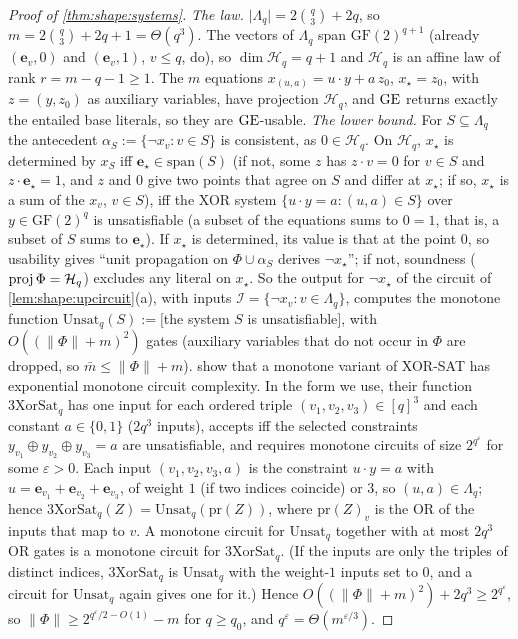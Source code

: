 \begin{proof}[Proof of \cref{thm:shape:systems}]
\emph{The law.} $\lvert\Lambda_q\rvert=2\binom q3+2q$, so $m=2\binom q3+2q+1=\Theta(q^3)$. The vectors of $\Lambda_q$ span $\mathrm{GF}(2)^{q+1}$ (already $(\mathbf e_v,0)$ and $(\mathbf e_v,1)$, $v\le q$, do), so $\dim\mathcal H_q=q+1$ and $\mathcal H_q$ is an affine law of rank $r=m-q-1\ge1$. The $m$ equations $x_{(u,a)}=u\cdot y+a\,z_0$, $x_\star=z_0$, with $z=(y,z_0)$ as auxiliary variables, have projection $\mathcal H_q$, and $\mathrm{GE}$ returns exactly the entailed base literals, so they are $\mathrm{GE}$-usable.
\emph{The lower bound.} For $S\subseteq\Lambda_q$ the antecedent $\alpha_S:=\{\neg x_v:v\in S\}$ is consistent, as $0\in\mathcal H_q$. On $\mathcal H_q$, $x_\star$ is determined by $x_S$ iff $\mathbf e_\star\in\mathrm{span}(S)$ (if not, some $z$ has $z\cdot v=0$ for $v\in S$ and $z\cdot\mathbf e_\star=1$, and $z$ and $0$ give two points that agree on $S$ and differ at $x_\star$; if so, $x_\star$ is a sum of the $x_v$, $v\in S$), iff the XOR system $\{u\cdot y=a:(u,a)\in S\}$ over $y\in\mathrm{GF}(2)^q$ is unsatisfiable (a subset of the equations sums to $0=1$, that is, a subset of $S$ sums to $\mathbf e_\star$). If $x_\star$ is determined, its value is that at the point $0$, so usability gives ``unit propagation on $\Phi\cup\alpha_S$ derives $\neg x_\star$''; if not, soundness ($\operatorname{proj}\Phi=\mathcal H_q$) excludes any literal on $x_\star$. So the output for $\neg x_\star$ of the circuit of \cref{lem:shape:upcircuit}(a), with inputs $\mathcal I=\{\neg x_v:v\in\Lambda_q\}$, computes the monotone function $\mathrm{Unsat}_q(S):=[$the system $S$ is unsatisfiable$]$, with $O((\lVert\Phi\rVert+m)^2)$ gates (auxiliary variables that do not occur in $\Phi$ are dropped, so $\bar m\le\lVert\Phi\rVert+m$).
\citet{goos2019adventures} show that a monotone variant of XOR-SAT has exponential monotone circuit complexity. In the form we use, their function $3\mathrm{XorSat}_q$ has one input for each ordered triple $(v_1,v_2,v_3)\in[q]^3$ and each constant $a\in\{0,1\}$ ($2q^3$ inputs), accepts iff the selected constraints $y_{v_1}\oplus y_{v_2}\oplus y_{v_3}=a$ are unsatisfiable, and requires monotone circuits of size $2^{q^{\varepsilon}}$ for some $\varepsilon>0$. Each input $(v_1,v_2,v_3,a)$ is the constraint $u\cdot y=a$ with $u=\mathbf e_{v_1}+\mathbf e_{v_2}+\mathbf e_{v_3}$, of weight $1$ (if two indices coincide) or $3$, so $(u,a)\in\Lambda_q$; hence $3\mathrm{XorSat}_q(Z)=\mathrm{Unsat}_q(\mathrm{pr}(Z))$, where $\mathrm{pr}(Z)_v$ is the OR of the inputs that map to $v$. A monotone circuit for $\mathrm{Unsat}_q$ together with at most $2q^3$ OR gates is a monotone circuit for $3\mathrm{XorSat}_q$. (If the inputs are only the triples of distinct indices, $3\mathrm{XorSat}_q$ is $\mathrm{Unsat}_q$ with the weight-$1$ inputs set to $0$, and a circuit for $\mathrm{Unsat}_q$ again gives one for it.) Hence $O((\lVert\Phi\rVert+m)^2)+2q^3\ge2^{q^{\varepsilon}}$, so $\lVert\Phi\rVert\ge2^{q^\varepsilon/2-O(1)}-m$ for $q\ge q_0$, and $q^\varepsilon=\Theta(m^{\varepsilon/3})$.
\end{proof}

